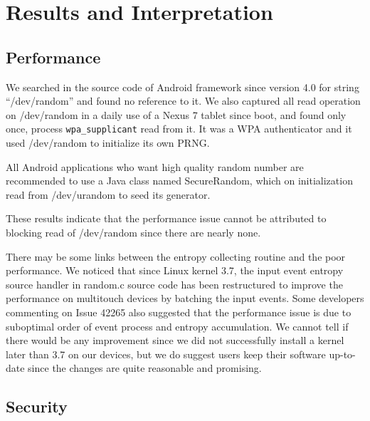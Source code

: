 \section{Results and Interpretation}


\subsection{Performance}

We searched in the source code of Android framework since version 4.0 for string ``/dev/random'' and found no reference to it. We also captured all read operation on /dev/random in a daily use of a Nexus 7 tablet since boot, and found only once, process \verb|wpa_supplicant| read from it. It was a WPA authenticator and it used /dev/random to initialize its own PRNG.

All Android applications who want high quality random number are recommended to use a Java class named SecureRandom, which on initialization read from /dev/urandom to seed its generator.

These results indicate that the performance issue cannot be attributed to blocking read of /dev/random since there are nearly none.

There may be some links between the entropy collecting routine and the poor performance. We noticed that since Linux kernel 3.7, the input event entropy source handler in random.c source code has been restructured \cite{commit43} to improve the performance on multitouch devices by batching the input events. Some developers commenting on Issue 42265 also suggested that the performance issue is due to suboptimal order of event process and entropy accumulation. We cannot tell if there would be any improvement since we did not successfully install a kernel later than 3.7 on our devices, but we do suggest users keep their software up-to-date since the changes are quite reasonable and promising.

\subsection{Security}


